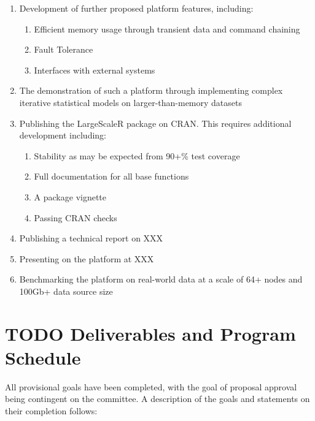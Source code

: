 \documentclass[a4paper,10pt]{article}
\begin{document}
\begin{enumerate}
	\item Development of further proposed platform features, including:
		\begin{enumerate}
			\item Efficient memory usage through transient data and command chaining
			\item Fault Tolerance
			\item Interfaces with external systems
		\end{enumerate}
	\item The demonstration of such a platform through implementing complex iterative statistical models on larger-than-memory datasets
	\item Publishing the LargeScaleR package on CRAN. This requires additional development including:
		\begin{enumerate}
			\item Stability as may be expected from 90+\% test coverage
			\item Full documentation for all base functions
			\item A package vignette
			\item Passing CRAN checks
		\end{enumerate}
	\item Publishing a technical report on XXX
	\item Presenting on the platform at XXX
	\item Benchmarking the platform on real-world data at a scale of 64+ nodes and 100Gb+ data source size
\end{enumerate}

\section{TODO Deliverables and Program Schedule}

All provisional goals have been completed, with the goal of proposal approval being contingent on the committee.
A description of the goals and statements on their completion follows:
\end{document}

